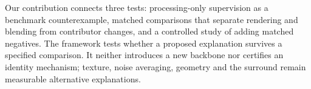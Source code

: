 Our contribution connects three tests: processing-only supervision as a benchmark counterexample, matched comparisons that separate rendering and blending from contributor changes, and a controlled study of adding matched negatives. The framework tests whether a proposed explanation survives a specified comparison. It neither introduces a new backbone nor certifies an identity mechanism; texture, noise averaging, geometry and the surround remain measurable alternative explanations.
